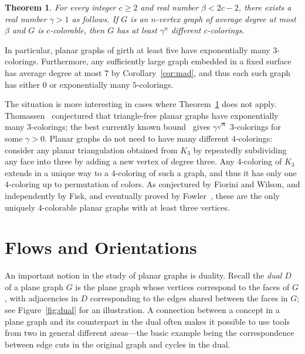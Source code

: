 \documentclass[12pt,twoside,openright,a4paper]{book}
\newtheorem{theorem}{Theorem}[chapter]
\begin{document}
\begin{theorem}\label{thm:expmany}
For every integer $c\ge 2$ and real number $\beta<2c-2$, there exists a real number $\gamma>1$ as follows.
If $G$ is an $n$-vertex graph of average degree at most $\beta$ and $G$ is $c$-colorable,
then $G$ has at least $\gamma^n$ different $c$-colorings.
\end{theorem}

In particular, planar graphs of girth at least five have exponentially many $3$-colorings.
Furthermore, any sufficiently large graph embedded in a fixed surface has average degree at most $7$
by Corollary~\ref{cor:mad}, and thus each such graph has either $0$ or exponentially many $5$-colorings.

The situation is more interesting in cases where Theorem~\ref{thm:expmany} does not apply.
Thomassen~\cite{thom-many} conjectured that triangle-free planar graphs have exponentially many $3$-colorings; the best currently known
bound~\cite{submany} gives $\gamma^{\sqrt{n}}$ $3$-colorings for some $\gamma>0$.
Planar graphs do not need to have many different $4$-colorings: consider any planar triangulation
obtained from $K_3$ by repeatedly subdividing any face into three by adding a new vertex of degree three.
Any $4$-coloring of $K_3$ extends in a unique way to a $4$-coloring of such a graph, and thus it has
only one $4$-coloring up to permutation of colors.  As conjectured by Fiorini and Wilson, and independently by Fisk, and eventually
proved by Fowler~\cite{fowler2000unique}, these are the only uniquely $4$-colorable planar graphs with at least three vertices.

\chapter{Flows and Orientations}\label{chap:flows}

An important notion in the study of planar graphs is duality.  Recall the \emph{dual} $D$ of a plane graph $G$
is the plane graph whose vertices correspond to the faces of $G$, with adjacencies in $D$ corresponding to
the edges shared between the faces in $G$; see Figure~\ref{fig:dual} for an illustration.  A connection between
a concept in a plane graph and its counterpart in the dual often makes it possible to use tools from two in general
different areas---the basic example being the correspondence between edge cuts in the original graph and cycles in the dual.
\end{document}
